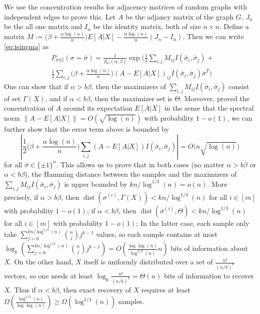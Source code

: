 \documentclass[conference]{IEEEtran}
\DeclareMathOperator{\dist}{dist}
\begin{document}
We use the concentration results for adjacency matrices of random graphs with independent edges to prove this.
Let $A$ be the adjancy matrix of the graph $G$, $J_n$ be the all one matrix and $I_n$ be the identity matrix, both of size $n\times n$.
Define a matrix
$
M:= \big(\beta+\frac{\alpha\log(n)}{n} \big) E[A|X]
-\frac{\alpha\log(n)}{n} (J_n-I_n).
$
Then we can write \eqref{eq:isingma}
as
\begin{align*}
&P_{\sigma|G}(\sigma=\bar{\sigma})
= \frac{1}{Z_G(\alpha,\beta)}
\exp\Big( \frac{1}{2} \sum_{i,j} M_{ij} I(\bar{\sigma}_i, \bar{\sigma}_j) + \\
& \frac{1}{2} \sum_{i,j}\big(\beta+\frac{\alpha\log(n)}{n} \big)  (A-E[A|X])_{ij} I(\bar{\sigma}_i, \bar{\sigma}_j) 
  \bar{\sigma}^T 
\Big)
\end{align*}
One can show that if $\alpha>b\beta$, then the maximizers of $\sum_{i,j} M_{ij} I(\bar{\sigma}_i, \bar{\sigma}_j)$ consist of set $\Gamma(X)$, and if $\alpha<b\beta$, then the maximizer set is $\Theta$.
Moreover, \cite{Hajek16} proved the concentration of $A$ around its expectation $E[A|X]$ in the sense that
the spectral norm $\|A-E[A|X]\| = O(\sqrt{\log(n)})$ with probability $1-o(1)$, we can further show that the error term above is bounded by
$$
\left|\frac{1}{2} \big(\beta+\frac{\alpha\log(n)}{n} \big)\sum_{i,j} (A-E[A|X])
 I( \bar{\sigma}_i, \bar{\sigma}_j) \right| = O \big( n \sqrt{\log(n)} \big)
$$
for all $\bar{\sigma}\in\{\pm 1\}^n$.
This allows us to prove that in both cases (no matter $\alpha>b\beta$ or $\alpha<b\beta$), the Hamming distance between the samples and the maximizers of $\sum_{i,j}  M_{ij}I(\bar{\sigma}_i, \bar{\sigma}_j)$ is upper bounded by $kn/\log^{1/3}(n)=o(n)$.
More precisely, if $\alpha>b\beta$, then $\dist(\sigma^{(i)},\Gamma(X) )< kn/\log^{1/3}(n)$ for all $i\in[m]$ with probability $1-o(1)$;
if $\alpha<b\beta$, then $\dist(\sigma^{(i)}, \Theta)< kn/\log^{1/3}(n)$ for all $i\in[m]$ with probability $1-o(1)$;
In the latter case, each sample only take $\sum_{j=0}^{kn/\log^{1/3}(n)}\binom{n}{j}j^{k-1}$ values, so each sample contains at most $\log_k(\sum_{j=0}^{kn/\log^{1/3}(n)}\binom{n}{j}j^{k-1})=O(\frac{\log\log(n)}{\log^{1/3}(n)} n)$ bits of information about $X$. On the other hand, $X$ itself is uniformly distributed over a set of $\frac{n!}{(n/k)^k}$ vectors, so one needs at least $\log_k\frac{n!}{(n/k)^k}=\Theta(n)$ bits of information to recover $X$. Thus if $\alpha<b\beta$, then exact recovery of $X$ requires at least $\Omega(\frac{\log^{1/3}(n)}{\log\log(n)})\ge \Omega(\log^{1/4}(n))$ samples.
\end{document}
